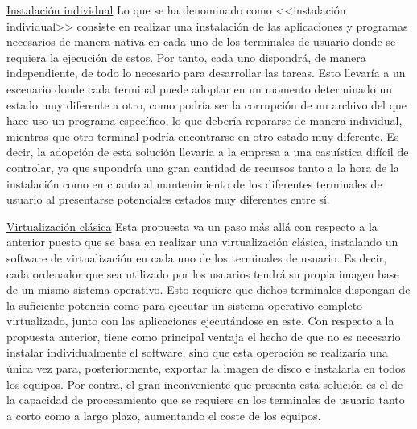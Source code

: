 \noindent\underline{Instalación individual}\newline
\indent Lo que se ha denominado como <<instalación individual>> consiste en realizar una instalación de las aplicaciones y programas necesarios de manera nativa en cada uno de los terminales de usuario donde se requiera la ejecución de estos. Por tanto, cada uno dispondrá, de manera independiente, de todo lo necesario para desarrollar las tareas. Esto llevaría a un escenario donde cada terminal puede adoptar en un momento determinado un estado muy diferente a otro, como podría ser la corrupción de un archivo del que hace uso un programa específico, lo que debería repararse de manera individual, mientras que otro terminal podría encontrarse en otro estado muy diferente. Es decir, la adopción de esta solución llevaría a la empresa a una casuística difícil de controlar, ya que supondría una gran cantidad de recursos tanto a la hora de la instalación como en cuanto al mantenimiento de los diferentes terminales de usuario al presentarse potenciales estados muy diferentes entre sí.

\noindent\underline{Virtualización clásica}\newline
\indent Esta propuesta va un paso más allá con respecto a la anterior puesto que se basa en realizar una virtualización clásica, instalando un software de virtualización en cada uno de los terminales de usuario. Es decir, cada ordenador que sea utilizado por los usuarios tendrá su propia imagen base de un mismo sistema operativo. Esto requiere que dichos terminales dispongan de la suficiente potencia como para ejecutar un sistema operativo completo virtualizado, junto con las aplicaciones ejecutándose en este. Con respecto a la propuesta anterior, tiene como principal ventaja el hecho de que no es necesario instalar individualmente el software, sino que esta operación se realizaría una única vez para, posteriormente, exportar la imagen de disco e instalarla en todos los equipos. Por contra, el gran inconveniente que presenta esta solución es el de la capacidad de procesamiento que se requiere en los terminales de usuario tanto a corto como a largo plazo, aumentando el coste de los equipos.

\clearpage

